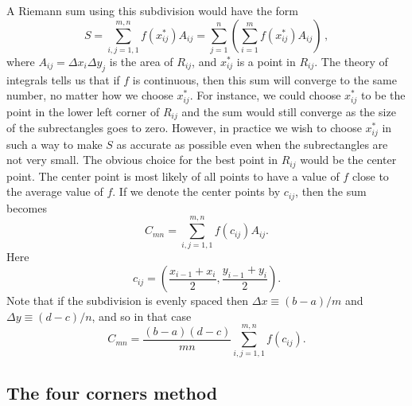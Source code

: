 A Riemann sum using this subdivision would have the form 
$$ S =
\sum_{i,j=1,1}^{m,n} f(x^*_{ij}) A_{ij} = \sum_{j=1}^n
\left(\sum_{i=1}^m f(x^*_{ij}) A_{ij}\right)\,, 
$$ where $A_{ij} =
\Delta x_i \Delta y_j$ is the area of $R_{ij}$, and $x^*_{ij}$ is a
point in $R_{ij}$. The theory of integrals tells us that if $f$ is
continuous, then this sum will converge to the same number, no matter
how we choose $x^*_{ij}$. For instance, we could choose $x^*_{ij}$ to
be the point in the lower left corner of $R_{ij}$ and the sum would
still converge as the size of the subrectangles goes to zero. However,
in practice we wish to choose $x^*_{ij}$ in such a way to make $S$ as
accurate as possible even when the subrectangles are not very
small. The obvious choice for the best point in $R_{ij}$ would be the
center point. The center point is most likely of all points to have a
value of $f$ close to the average value of $f$. If we denote the
center points by $c_{ij}$, then the sum becomes
\[ C_{mn} =
\sum_{i,j=1,1}^{m,n} f(c_{ij}) A_{ij}.
\]
Here
\[
 c_{ij} = \left(
\frac{x_{i-1} + x_i}{2}, \frac{y_{i-1} + y_i}{2} \right).
\]
 Note
that if the subdivision is evenly spaced then $\Delta x \equiv
(b-a)/m$ and $\Delta y \equiv (d-c)/n$, and so in that case
\[
 C_{mn}
= \frac{(b-a)(d-c)}{mn} \sum_{i,j=1,1}^{m,n} f(c_{ij}).
\]



\subsection*{The four corners method}

